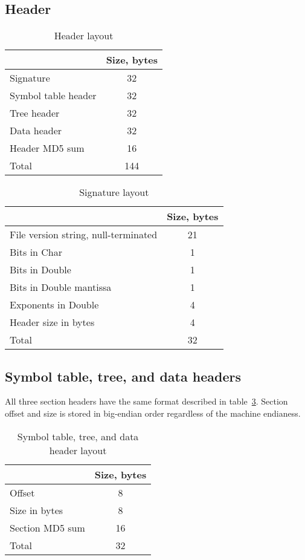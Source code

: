 \documentclass[10pt,letterpaper]{article}
\newcommand{\bc}{\begin{center}}
\newcommand{\ec}{\end{center}}
\begin{document}
\subsection{Header}

\begin{table}[h]
\bc
\caption{Header layout}\label{tab:header}
\begin{tabular}{|l|c|} \hline
 & Size, bytes \\ \hline\hline
Signature & 32 \\ \hline
Symbol table header & 32 \\ \hline
Tree header & 32 \\ \hline
Data header & 32 \\ \hline
Header MD5 sum & 16 \\ \hline\hline
Total & 144 \\ \hline
\end{tabular}
\ec
\end{table}

\begin{table}[h]
\bc
\caption{Signature layout}\label{tab:signature}
\begin{tabular}{|l|c|} \hline
 & Size, bytes \\ \hline\hline
File version string, null-terminated &  21\\ \hline
Bits in Char & 1 \\ \hline
Bits in Double & 1 \\ \hline
Bits in Double mantissa & 1 \\ \hline
Exponents in Double & 4 \\ \hline
Header size in bytes & 4 \\ \hline\hline
Total & 32 \\ \hline
\end{tabular}
\ec
\end{table}


\subsection{Symbol table, tree, and data headers}
All three section headers have the same format described in table~\ref{tab:shdr}. Section offset and size is stored in big-endian order regardless of the machine endianess.
\begin{table}[h]
\bc
\caption{Symbol table, tree, and data header layout}\label{tab:shdr}
\begin{tabular}{|l|c|} \hline
 & Size, bytes \\ \hline\hline
Offset  & 8 \\ \hline
Size in bytes & 8 \\ \hline
Section MD5 sum & 16 \\ \hline
Total & 32 \\ \hline
\end{tabular}
\ec
\end{table}
\end{document}
